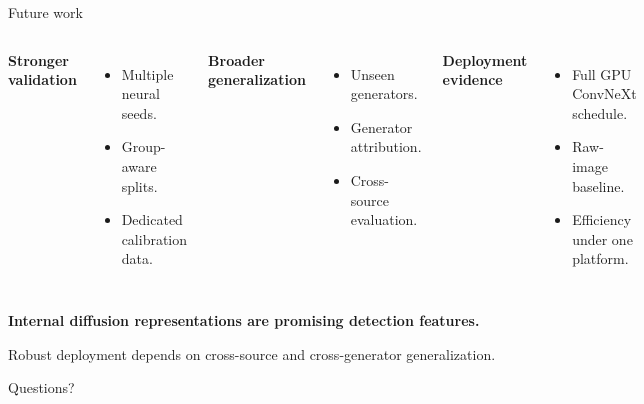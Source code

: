 \documentclass[11pt,aspectratio=169,t]{beamer}
\begin{document}
\begin{frame}{Future work}
  \begin{columns}[T,onlytextwidth]
      {\color{Blue}\bfseries Stronger validation}\par\vspace{0.25cm}
      \begin{itemize}
        \item Multiple neural seeds.
        \item Group-aware splits.
        \item Dedicated calibration data.
      \end{itemize}
      {\color{Orange}\bfseries Broader generalization}\par\vspace{0.25cm}
      \begin{itemize}
        \item Unseen generators.
        \item Generator attribution.
        \item Cross-source evaluation.
      \end{itemize}
      {\color{Green}\bfseries Deployment evidence}\par\vspace{0.25cm}
      \begin{itemize}
        \item Full GPU ConvNeXt schedule.
        \item Raw-image baseline.
        \item Efficiency under one platform.
      \end{itemize}
  \end{columns}
  \vspace{0.55cm}
  \begin{center}
    {\color{Navy}\bfseries\large Internal diffusion representations are promising detection features.}\par
    \vspace{0.25cm}
    {\color{Muted}Robust deployment depends on cross-source and cross-generator generalization.}\par
    \vspace{0.38cm}
    {\color{Blue}\large Questions?}
  \end{center}
\end{frame}

\appendix
\end{document}
